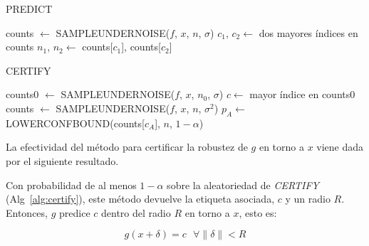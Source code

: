 \begin{algorithm}
\caption{PREDICT}\label{alg:predict}
\BlankLine
counts $\leftarrow$ SAMPLEUNDERNOISE($f$, $x$, $n$, $\sigma$)\;
$c_1$, $c_2 \leftarrow$ dos mayores índices en counts\;
$n_1$, $n_2 \leftarrow$ counts[$c_1$], counts[$c_2$]\;
\end{algorithm}

\begin{algorithm}
\caption{CERTIFY}\label{alg:certify}
\BlankLine
counts0 $\leftarrow$ SAMPLEUNDERNOISE($f$, $x$, $n_0$, $\sigma$)\;
$c \leftarrow$ mayor índice en counts0\;
counts $\leftarrow$ SAMPLEUNDERNOISE($f$, $x$, $n$, $\sigma^2$)\;
$p_A \leftarrow$ LOWERCONFBOUND(counts[$c_A$], $n$, $1 - \alpha$)\;
\end{algorithm}


La efectividad del método para certificar la robustez de $g$ en torno a $x$ viene dada por el siguiente resultado.

\begin{proposicion}
Con probabilidad de al menos $1 - \alpha$ sobre la aleatoriedad de \textit{CERTIFY} (Alg~\ref{alg:certify}), este método devuelve la etiqueta asociada, $c$ y un radio $R$. Entonces, $g$ predice $c$ dentro del radio $R$ en torno a $x$, esto es:

$$g(x + \delta) = c \text{ } \forall \| \delta \| < R$$
\end{proposicion}